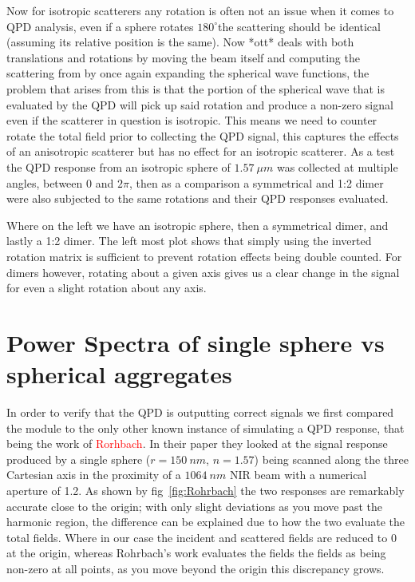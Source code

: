 \documentclass[a4paper,oneside,11pt]{book}
\begin{document}
Now for isotropic scatterers any rotation is often not an issue when it comes to QPD analysis, even if a sphere rotates $180^{\circ}$the scattering should be identical (assuming its relative position is the same). Now *ott* deals with both translations and rotations by moving the beam itself and computing the scattering from by once again expanding the spherical wave functions, the problem that arises from this is that the portion of the spherical wave that is evaluated by the QPD will pick up said rotation and produce a non-zero signal even if the scatterer in question is isotropic. This means we need to counter rotate the total field prior to collecting the QPD signal, this captures the effects of an anisotropic scatterer but has no effect for an isotropic scatterer. As a test the QPD response from an isotropic sphere of $1.57 \ \mu m$ was collected at multiple angles, between 0 and $2\pi$, then as a comparison a symmetrical and 1:2 dimer were also subjected to the same rotations and their QPD responses evaluated. 
  
Where on the left we have an isotropic sphere, then a symmetrical dimer, and lastly a 1:2 dimer. The left most plot shows that simply using the inverted rotation matrix is sufficient to prevent rotation effects being double counted.
For dimers however, rotating about a given axis gives us a clear change in the signal for even a slight rotation about any axis. 

\section{Power Spectra of single sphere vs spherical aggregates}
In order to verify that the QPD is outputting correct signals we first compared the module to the only other known instance of simulating a QPD response, that being the work of \textcolor{red}{Rorhbach}. In their paper they looked at the signal response produced by a single sphere ($r = 150\ nm$, $n = 1.57$) being scanned along the three Cartesian axis in the proximity of a $1064\ nm$ NIR beam with a numerical aperture of 1.2. As shown by fig~\ref{fig:Rohrbach} the two responses are remarkably accurate close to the origin; with only slight deviations as you move past the harmonic region, the difference can be explained due to how the two evaluate the total fields. Where in our case the incident and scattered fields are reduced to 0 at the origin, whereas Rohrbach's work evaluates the fields the fields as being non-zero at all points, as you move beyond the origin this discrepancy grows. 
\end{document}
